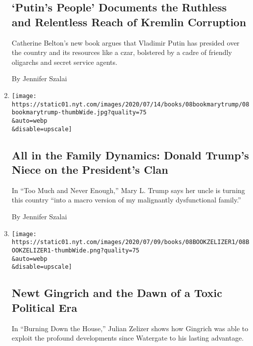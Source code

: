 \begin{enumerate}
{  \subsection{`Putin's People' Documents the Ruthless and Relentless
  Reach of Kremlin
  Corruption}\label{putins-people-documents-the-ruthless-and-relentless-reach-of-kremlin-corruption}}

  Catherine Belton's new book argues that Vladimir Putin has presided
  over the country and its resources like a czar, bolstered by a cadre
  of friendly oligarchs and secret service agents.

  By Jennifer Szalai
\item
  \href{/2020/07/08/books/review-too-much-never-enough-mary-trump.html}{}

  \texttt{[image: https://static01.nyt.com/images/2020/07/14/books/08bookmarytrump/08bookmarytrump-thumbWide.jpg?quality=75\\\&auto=webp\\\&disable=upscale]}

  \hypertarget{all-in-the-family-dynamics-donald-trumps-niece-on-the-presidents-clan}{%
  \subsection{All in the Family Dynamics: Donald Trump's Niece on the
  President's
  Clan}\label{all-in-the-family-dynamics-donald-trumps-niece-on-the-presidents-clan}}

  In ``Too Much and Never Enough,'' Mary L. Trump says her uncle is
  turning this country ``into a macro version of my malignantly
  dysfunctional family.''

  By Jennifer Szalai
\item
  \href{/2020/07/04/books/review-burning-down-house-newt-gingrich-julian-zelizer.html}{}

  \texttt{[image: https://static01.nyt.com/images/2020/07/09/books/08BOOKZELIZER1/08BOOKZELIZER1-thumbWide.png?quality=75\\\&auto=webp\\\&disable=upscale]}

  \hypertarget{newt-gingrich-and-the-dawn-of-a-toxic-political-era}{%
  \subsection{Newt Gingrich and the Dawn of a Toxic Political
  Era}\label{newt-gingrich-and-the-dawn-of-a-toxic-political-era}}

  In ``Burning Down the House,'' Julian Zelizer shows how Gingrich was
  able to exploit the profound developments since Watergate to his
  lasting advantage.


\end{enumerate}
